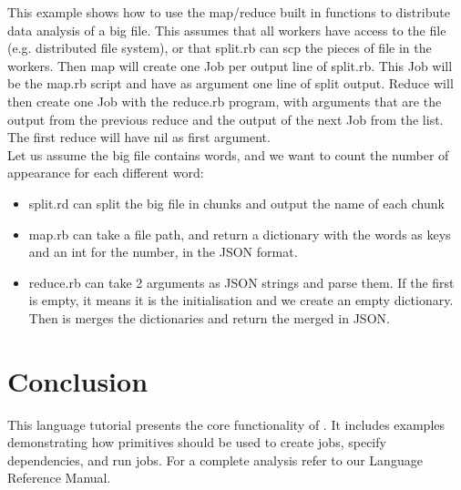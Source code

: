 This example shows how to use the map/reduce built in functions to distribute data
analysis of a big file. This assumes that all workers have access to the file (e.g.
distributed file system), or that split.rb can scp the pieces of file in the workers.
Then map will create one Job per output line of split.rb. This Job will be the map.rb
script and have as argument one line of split output. Reduce will then create one Job
with the reduce.rb program, with arguments that are the output from the previous reduce and
the output of the next Job from the list. The first reduce will have nil as first argument.\\
Let us assume the big file contains words, and we want to count the number of appearance for
each different word:
\begin{itemize}
  \item split.rd can split the big file in chunks and output the name of each chunk
  \item map.rb can take a file path, and return a dictionary with the words as keys
    and an int for the number, in the JSON format.
  \item reduce.rb can take 2 arguments as JSON strings and parse them. If the first is
    empty, it means it is the initialisation and we create an empty dictionary. Then is
    merges the dictionaries and return the merged in JSON.
\end{itemize}


\section{Conclusion}
\label{sect:conclusion}
This language tutorial presents the core functionality of \lang{}. It includes examples
demonstrating how \lang{} primitives should be used to create jobs, specify dependencies, and run
jobs. For a complete analysis refer to our Language Reference Manual.
